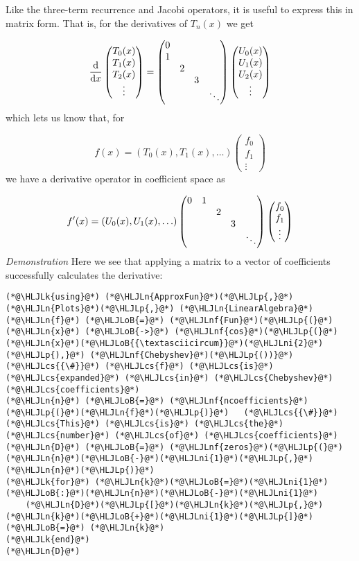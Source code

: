 \documentclass[12pt,a4paper]{article}
\newcommand{\HLJLk}[1]{\textcolor[RGB]{148,91,176}{\textbf{#1}}}
\newcommand{\HLJLn}[1]{#1}
\newcommand{\HLJLnf}[1]{\textcolor[RGB]{66,102,213}{#1}}
\newcommand{\HLJLni}[1]{\textcolor[RGB]{59,151,46}{#1}}
\newcommand{\HLJLoB}[1]{\textcolor[RGB]{102,102,102}{\textbf{#1}}}
\newcommand{\HLJLp}[1]{#1}
\newcommand{\HLJLcs}[1]{\textcolor[RGB]{153,153,119}{\textit{#1}}}
\def\D{ {\rm d} }
\def\dx{\D x}
\begin{document}
Like the three-term recurrence and Jacobi operators, it is useful to express this in matrix form. That is, for the derivatives of $T_n(x)$ we get

\[
{\D \over \dx}  \begin{pmatrix} T_0(x) \\ T_1(x) \\ T_2(x) \\ \vdots \end{pmatrix}= \begin{pmatrix}
0 \cr
1 \cr
& 2 \cr
&& 3 \cr
&&&\ddots
\end{pmatrix} \begin{pmatrix} U_0(x) \\ U_1(x) \\ U_2(x) \\ \vdots \end{pmatrix}
\]
which lets us know that, for

\[
f(x) = (T_0(x),T_1(x),\ldots) \begin{pmatrix} f_0\\f_1\\\vdots \end{pmatrix}
\]
we have a derivative operator in coefficient space as

\[
f'(x) = (U_0(x),U_1(x),\ldots)\begin{pmatrix}
0 & 1 \cr
&& 2 \cr
&&& 3 \cr
&&&&\ddots
\end{pmatrix}  \begin{pmatrix} f_0\\f_1\\\vdots \end{pmatrix}
\]
\emph{Demonstration} Here we see that applying a matrix to a vector of coefficients successfully calculates the derivative:


\begin{lstlisting}
(*@\HLJLk{using}@*) (*@\HLJLn{ApproxFun}@*)(*@\HLJLp{,}@*) (*@\HLJLn{Plots}@*)(*@\HLJLp{,}@*) (*@\HLJLn{LinearAlgebra}@*)
(*@\HLJLn{f}@*) (*@\HLJLoB{=}@*) (*@\HLJLnf{Fun}@*)(*@\HLJLp{(}@*)(*@\HLJLn{x}@*) (*@\HLJLoB{->}@*) (*@\HLJLnf{cos}@*)(*@\HLJLp{(}@*)(*@\HLJLn{x}@*)(*@\HLJLoB{{\textasciicircum}}@*)(*@\HLJLni{2}@*)(*@\HLJLp{),}@*) (*@\HLJLnf{Chebyshev}@*)(*@\HLJLp{())}@*)   (*@\HLJLcs{{\#}}@*) (*@\HLJLcs{f}@*) (*@\HLJLcs{is}@*) (*@\HLJLcs{expanded}@*) (*@\HLJLcs{in}@*) (*@\HLJLcs{Chebyshev}@*) (*@\HLJLcs{coefficients}@*)
(*@\HLJLn{n}@*) (*@\HLJLoB{=}@*) (*@\HLJLnf{ncoefficients}@*)(*@\HLJLp{(}@*)(*@\HLJLn{f}@*)(*@\HLJLp{)}@*)   (*@\HLJLcs{{\#}}@*) (*@\HLJLcs{This}@*) (*@\HLJLcs{is}@*) (*@\HLJLcs{the}@*) (*@\HLJLcs{number}@*) (*@\HLJLcs{of}@*) (*@\HLJLcs{coefficients}@*)
(*@\HLJLn{D}@*) (*@\HLJLoB{=}@*) (*@\HLJLnf{zeros}@*)(*@\HLJLp{(}@*)(*@\HLJLn{n}@*)(*@\HLJLoB{-}@*)(*@\HLJLni{1}@*)(*@\HLJLp{,}@*)(*@\HLJLn{n}@*)(*@\HLJLp{)}@*)
(*@\HLJLk{for}@*) (*@\HLJLn{k}@*)(*@\HLJLoB{=}@*)(*@\HLJLni{1}@*)(*@\HLJLoB{:}@*)(*@\HLJLn{n}@*)(*@\HLJLoB{-}@*)(*@\HLJLni{1}@*)
    (*@\HLJLn{D}@*)(*@\HLJLp{[}@*)(*@\HLJLn{k}@*)(*@\HLJLp{,}@*)(*@\HLJLn{k}@*)(*@\HLJLoB{+}@*)(*@\HLJLni{1}@*)(*@\HLJLp{]}@*) (*@\HLJLoB{=}@*) (*@\HLJLn{k}@*)
(*@\HLJLk{end}@*)
(*@\HLJLn{D}@*)
\end{lstlisting}
\end{document}
